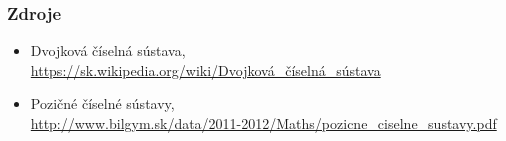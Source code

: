 \documentclass[pdf,slideColor,fyma]{beamer}
\begin{document}
\begin{frame}
\frametitle{Zdroje}
	\begin{itemize}
		\item Dvojková číselná sústava,\\
		\url{https://sk.wikipedia.org/wiki/Dvojková\_číselná\_sústava}
		\item Pozičné číselné sústavy,\\
		\url{http://www.bilgym.sk/data/2011-2012/Maths/pozicne\_ciselne\_sustavy.pdf}
	\end{itemize}
\end{frame}
\end{document}
